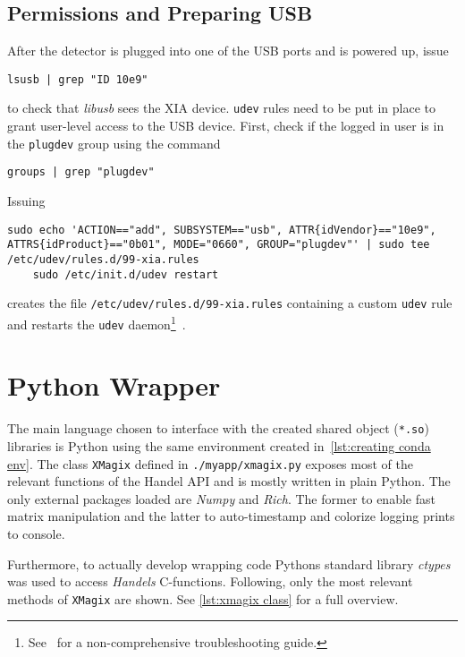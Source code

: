         \subsection{Permissions and Preparing USB}
            After the detector is plugged into one of the USB ports and is powered up, issue
            \begin{lstlisting}[style=mybash, numbers=none, label={lst:lsusb}]
    lsusb | grep "ID 10e9"
            \end{lstlisting}
            to check that \textit{libusb} sees the XIA device.
            \texttt{udev} rules need to be put in place to grant user-level access to the USB device.
            First, check if the logged in user is in the \texttt{plugdev} group using the command
            \begin{lstlisting}[style=mybash, numbers=none, label={lst:udev}]
    groups | grep "plugdev"
            \end{lstlisting}
            Issuing
            \begin{lstlisting}[style=mybash, numbers=none, label={lst:udev}]
    sudo echo 'ACTION=="add", SUBSYSTEM=="usb", ATTR{idVendor}=="10e9", ATTRS{idProduct}=="0b01", MODE="0660", GROUP="plugdev"' | sudo tee /etc/udev/rules.d/99-xia.rules
    sudo /etc/init.d/udev restart
            \end{lstlisting}
            creates the file \texttt{/etc/udev/rules.d/99-xia.rules} containing a custom \texttt{udev} rule and restarts the \texttt{udev} daemon\footnote{See~\cite{Software.XraythesisHandel.2023} for a non-comprehensive troubleshooting guide.}~\cite{Software.HandelRelease.2023,Software.XraythesisHandel.2023}.

    \section{Python Wrapper}
        The main language chosen to interface with the created shared object (\texttt{*.so}) libraries is Python using the same environment created in~\cref{lst:creating conda env}.
        The class \texttt{XMagix} defined in \texttt{./myapp/xmagix.py} exposes most of the relevant functions of the Handel API and is mostly written in plain Python.
        The only external packages loaded are \textit{Numpy} and \textit{Rich}.
        The former to enable fast matrix manipulation and the latter to auto-timestamp and colorize logging prints to console.\par\medskip

        Furthermore, to actually develop wrapping code Pythons standard library \textit{ctypes} was used to access \textit{Handels} C-functions.
        Following, only the most relevant methods of \texttt{XMagix} are shown.
        See \cref{lst:xmagix class} for a full overview.\par\medskip

